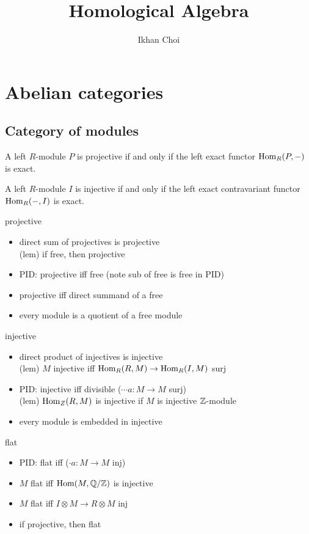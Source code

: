 \documentclass{../../large}
\begin{document}
\title{Homological Algebra}
\author{Ikhan Choi}
\maketitle
\tableofcontents


\part{Abelian categories}





\chapter{Category of modules}

A left $R$-module $P$ is projective if and only if the left exact functor $\operatorname{Hom}_R(P,-)$ is exact.

A left $R$-module $I$ is injective if and only if the left exact contravariant functor $\operatorname{Hom}_R(-,I)$ is exact.


projective
\begin{itemize}
\item direct sum of projectives is projective
    \\(lem) if free, then projective
\item PID: projective iff free (note sub of free is free in PID)
\item projective iff direct summand of a free
\item every module is a quotient of a free module
\end{itemize}

injective
\begin{itemize}
\item direct product of injectives is injective
    \\(lem) $M$ injective iff $\operatorname{Hom}_R(R,M)\to\operatorname{Hom}_R(I,M)$ surj
\item PID: injective iff divisible ($\cdots a:M\to M$ surj)
    \\(lem) $\operatorname{Hom}_Z(R,M)$ is injective if $M$ is injective $\mathbb{Z}$-module
\item every module is embedded in injective
\end{itemize}

flat
\begin{itemize}
\item PID: flat iff ($\cdot a:M\to M$ inj)
\item $M$ flat iff $\operatorname{Hom}(M,\mathbb{Q}/\mathbb{Z})$ is injective
\item $M$ flat iff $I\otimes M\to R\otimes M$ inj
\item if projective, then flat
\end{itemize}
\end{document}

